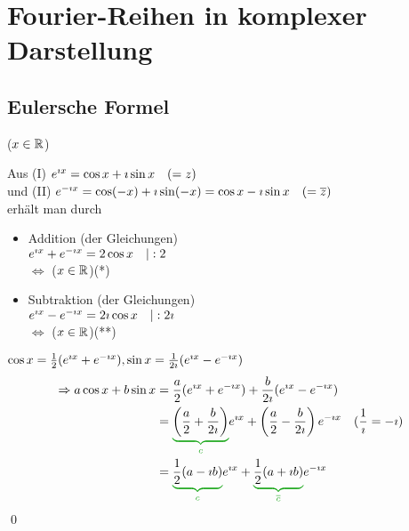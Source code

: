 \clearpage
\section{Fourier-Reihen in komplexer Darstellung}
\subsection{Eulersche Formel}
\hhspace{2cm}\qquad($x\in\mathbb{R}$)

Aus (I) $e^{\imath x}=\cos x+\imath\sin x\quad(=z)$\\
und (II) $e^{-\imath x}=\cos(-x)+\imath\sin(-x)=\cos x-\imath\sin x\quad(=\overline{z})$\\
erhält man durch
\begin{itemize}
	\item Addition (der Gleichungen)\\
	\hhspace{2cm}$e^{\imath x}+e^{-\imath x}=2\cos x\quad|:2$\\
	\hhspace{2cm}$\Leftrightarrow$ \quad($x\in\mathbb{R}$)\qquad(*)
	
	\item Subtraktion (der Gleichungen)\\
	\hhspace{2cm}$e^{\imath x}-e^{-\imath x}=2\imath\cos x\quad|:2\imath$\\
	\hhspace{2cm}$\Leftrightarrow$ \quad($x\in\mathbb{R}$)\qquad(**)
\end{itemize}


\Beweis $\cos x=\frac{1}{2}(e^{\imath x}+e^{-\imath x}), \sin x=\frac{1}{2\imath}(e^{\imath x}-e^{-\imath x})$
\begin{align*}
\Rightarrow a\cos x+b\sin x&=\dfrac{a}{2}(e^{\i x}+e^{-\i x})+\dfrac{b}{2\i}(e^{\i x}-e^{-\i x})\\
&=\greenunderbrace{\left(\dfrac{a}{2}+\dfrac{b}{2\i}\right)}{c}e^{\i x}+\left(\dfrac{a}{2}-\dfrac{b}{2\i}\right)e^{-\i x}&(\dfrac{1}{\i}=-\i)\\
&=\greenunderbrace{\dfrac{1}{2}(a-\i b)}{c}e^{\i x}+\greenunderbrace{\dfrac{1}{2}(a+\i b)}{\ol{c}}e^{-\i x}
\end{align*}
\qed


